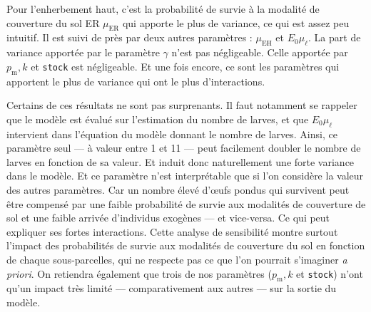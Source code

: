 Pour l'enherbement haut, c'est la probabilité de survie à la modalité de couverture du sol ER $\mu_{\text{ER}}$ qui apporte le plus de variance, ce qui est assez peu intuitif.
Il est suivi de près par deux autres paramètres : $\mu_{\text{EH}}$ et $E_0\mu_{\ell}$.
La part de variance apportée par le paramètre $\gamma$ n'est pas négligeable.
Celle apportée par $p_{\text{m}}, k$ et \texttt{stock} est négligeable.
Et une fois encore, ce sont les paramètres qui apportent le plus de variance qui ont le plus d'interactions.
% 

Certains de ces résultats ne sont pas surprenants.
Il faut notamment se rappeler que le modèle est évalué sur l'estimation du nombre de larves, et que $E_0\mu_\ell$ intervient dans l'équation du modèle donnant le nombre de larves.
Ainsi, ce paramètre seul --- à valeur entre 1 et 11 --- peut facilement doubler le nombre de larves en fonction de sa valeur. Et induit donc naturellement une forte variance dans le modèle.
Et ce paramètre n'est interprétable que si l'on considère la valeur des autres paramètres.
Car un nombre élevé d'œufs pondus qui survivent peut être compensé par une faible probabilité de survie aux modalités de couverture de sol et une faible arrivée d'individus exogènes --- et vice-versa.
Ce qui peut expliquer ses fortes interactions.
Cette analyse de sensibilité montre surtout l'impact des probabilités de survie aux modalités de couverture du sol en fonction de chaque sous-parcelles, qui ne respecte pas ce que l'on pourrait s'imaginer \emph{a priori}.
On retiendra également que trois de nos paramètres ($p_{\text{m}}, k$ et \texttt{stock}) n'ont qu'un impact très limité --- comparativement aux autres --- sur la sortie du modèle.


